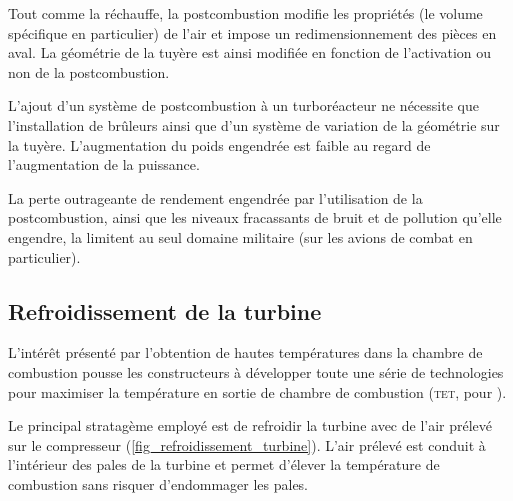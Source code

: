 {{		Tout comme la réchauffe, la postcombustion modifie les propriétés (le volume spécifique en particulier) de l’air et impose un redimensionnement des pièces en aval. La géométrie de la tuyère est ainsi modifiée en fonction de l’activation ou non de la postcombustion.

		L’ajout d’un système de postcombustion à un turboréacteur ne nécessite que l'in\-stal\-la\-tion de brûleurs ainsi que d’un système de variation de la géométrie sur la tuyère. L’augmentation du poids engendrée est faible au regard de l’augmentation de la puissance.

		La perte outrageante de rendement engendrée par l’utilisation de la postcombustion, ainsi que les niveaux fracassants de bruit et de pollution qu’elle engendre, la limitent au seul domaine militaire (sur les avions de combat en particulier).

		 

	\subsection{Refroidissement de la turbine}

		L’intérêt présenté par l’obtention de hautes températures dans la chambre de combustion pousse les constructeurs à développer toute une série de technologies pour maximiser la température en sortie de chambre de combustion (\textsc{tet}, pour ).

		Le principal stratagème employé est de refroidir la turbine avec de l’air prélevé sur le compresseur (\cref{fig_refroidissement_turbine}). L’air prélevé est conduit à l’intérieur des pales de la turbine et permet d’élever la température de combustion sans risquer d’endommager les pales.

}}
